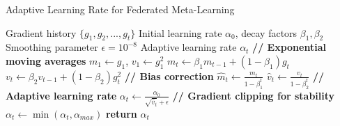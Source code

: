\begin{algorithm}[htbp]
\caption{Adaptive Learning Rate for Federated Meta-Learning}
\label{alg:adaptive_lr}
\begin{algorithmic}[1]
\REQUIRE Gradient history $\{g_1, g_2, ..., g_t\}$
\REQUIRE Initial learning rate $\alpha_0$, decay factors $\beta_1, \beta_2$
\REQUIRE Smoothing parameter $\epsilon = 10^{-8}$
\ENSURE Adaptive learning rate $\alpha_t$
\STATE \textbf{// Exponential moving averages}
    \STATE $m_1 \gets g_1$, $v_1 \gets g_1^2$
\ELSE
    \STATE $m_t \gets \beta_1 m_{t-1} + (1-\beta_1) g_t$ 
    \STATE $v_t \gets \beta_2 v_{t-1} + (1-\beta_2) g_t^2$ 
\ENDIF
\STATE \textbf{// Bias correction}
\STATE $\hat{m}_t \gets \frac{m_t}{1 - \beta_1^t}$
\STATE $\hat{v}_t \gets \frac{v_t}{1 - \beta_2^t}$
\STATE \textbf{// Adaptive learning rate}
\STATE $\alpha_t \gets \frac{\alpha_0}{\sqrt{\hat{v}_t} + \epsilon}$
\STATE \textbf{// Gradient clipping for stability}
\STATE $\alpha_t \gets \min(\alpha_t, \alpha_{max})$
\STATE \textbf{return} $\alpha_t$
\end{algorithmic}
\end{algorithm}

